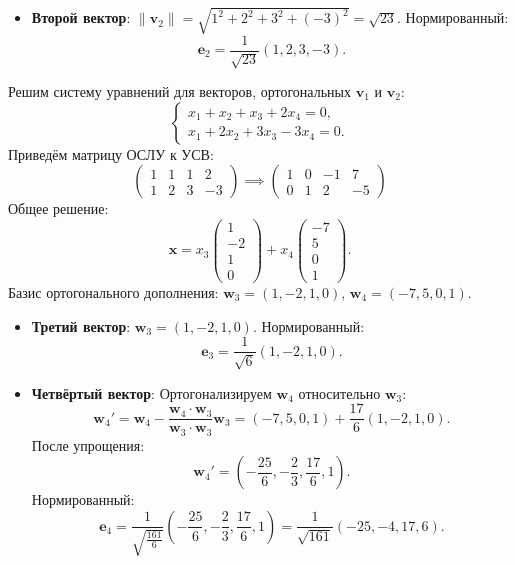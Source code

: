 \documentclass[a4paper]{article}
\newcommand{\mat}[1]{\begin{pmatrix} #1 \end{pmatrix}}
\begin{document}
\begin{enumerate}
\begin{itemize}
        \item \textbf{Второй вектор}:  
        \(\|\mathbf{v}_2\| = \sqrt{1^2 + 2^2 + 3^2 + (-3)^2} = \sqrt{23}\).  
        Нормированный:
        \[
        \mathbf{e}_2 = \frac{1}{\sqrt{23}}(1, 2, 3, -3).
        \]
    \end{itemize}
    Решим систему уравнений для векторов, ортогональных \(\mathbf{v}_1\) и \(\mathbf{v}_2\):
    \[
    \begin{cases}
    x_1 + x_2 + x_3 + 2x_4 = 0, \\
    x_1 + 2x_2 + 3x_3 - 3x_4 = 0.
    \end{cases}
    \]
    Приведём матрицу ОСЛУ к УСВ:
    \[
    \mat{1& 1& 1& 2\\1 & 2& 3 & -3}
    \implies
    \mat{1 & 0 & -1 & 7 \\ 0 & 1 & 2 & -5}
    \]
    Общее решение:
    \[
    \mathbf{x} = x_3 \begin{pmatrix}1 \\ -2 \\ 1 \\ 0\end{pmatrix} + x_4 \begin{pmatrix}-7 \\ 5 \\ 0 \\ 1\end{pmatrix}.
    \]
    Базис ортогонального дополнения: \(\mathbf{w}_3 = (1, -2, 1, 0)\), \(\mathbf{w}_4 = (-7, 5, 0, 1)\).

    \begin{itemize}
        \item \textbf{Третий вектор}:  
        \(\mathbf{w}_3 = (1, -2, 1, 0)\).  
        Нормированный:
        \[
        \mathbf{e}_3 = \frac{1}{\sqrt{6}}(1, -2, 1, 0).
        \]

        \item \textbf{Четвёртый вектор}:  
        Ортогонализируем \(\mathbf{w}_4\) относительно \(\mathbf{w}_3\):
        \[
        \mathbf{w}_4' = \mathbf{w}_4 - \frac{\mathbf{w}_4 \cdot \mathbf{w}_3}{\mathbf{w}_3 \cdot \mathbf{w}_3} \mathbf{w}_3 = (-7, 5, 0, 1) + \frac{17}{6}(1, -2, 1, 0).
        \]
        После упрощения:
        \[
        \mathbf{w}_4' = \left(-\frac{25}{6}, -\frac{2}{3}, \frac{17}{6}, 1\right).
        \]
        Нормированный:
        \[
        \mathbf{e}_4 = \frac{1}{\sqrt{\frac{161}{6}}} \left(-\frac{25}{6}, -\frac{2}{3}, \frac{17}{6}, 1\right) = \frac{1}{\sqrt{161}}(-25, -4, 17, 6).
        \]
    \end{itemize}


\end{enumerate}
\end{document}
